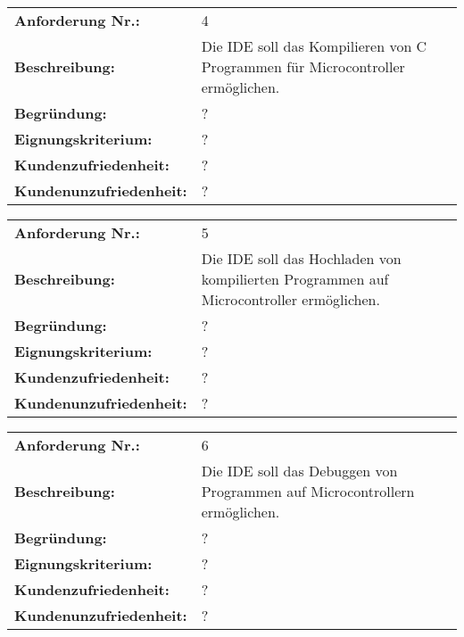 \begin{tabularx}{\textwidth}{|lX|}
    \hline
    \textbf{Anforderung Nr.:}     & 4                                                                              \\
    \textbf{Beschreibung:}        & Die IDE soll das Kompilieren von C Programmen für Microcontroller ermöglichen. \\
    \textbf{Begründung:}          & ?                                                                              \\
    \textbf{Eignungskriterium:}   & ?                                                                              \\
    \textbf{Kundenzufriedenheit:} & ?                                                                              \\ \textbf{Kundenunzufriedenheit:} & ? \\
    \hline
\end{tabularx}

\begin{tabularx}{\textwidth}{|lX|}
    \hline
    \textbf{Anforderung Nr.:}     & 5                                                                                       \\
    \textbf{Beschreibung:}        & Die IDE soll das Hochladen von kompilierten Programmen auf Microcontroller ermöglichen. \\
    \textbf{Begründung:}          & ?                                                                                       \\
    \textbf{Eignungskriterium:}   & ?                                                                                       \\
    \textbf{Kundenzufriedenheit:} & ?                                                                                       \\ \textbf{Kundenunzufriedenheit:} & ? \\
    \hline
\end{tabularx}

\begin{tabularx}{\textwidth}{|lX|}
    \hline
    \textbf{Anforderung Nr.:}     & 6                                                                          \\
    \textbf{Beschreibung:}        & Die IDE soll das Debuggen von Programmen auf Microcontrollern ermöglichen. \\
    \textbf{Begründung:}          & ?                                                                          \\
    \textbf{Eignungskriterium:}   & ?                                                                          \\
    \textbf{Kundenzufriedenheit:} & ?                                                                          \\ \textbf{Kundenunzufriedenheit:} & ? \\
    \hline
\end{tabularx}

